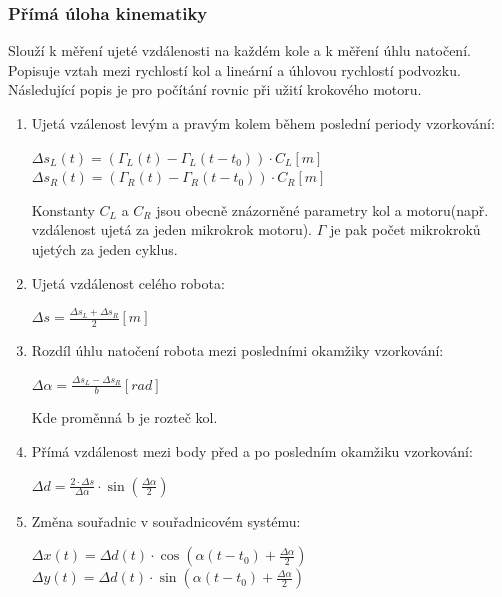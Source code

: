 \subsubsection{Přímá úloha kinematiky}
Slouží k měření ujeté vzdálenosti na každém kole a k měření úhlu natočení.\\
Popisuje vztah mezi rychlostí kol a lineární a úhlovou rychlostí podvozku.\\
Následující popis je pro počítání rovnic při užití krokového motoru.\\
\begin{enumerate}
    \item Ujetá vzálenost levým a pravým kolem během poslední periody vzorkování:
          \begin{center}
              \(\Delta s_L(t) = (\Gamma_L(t)-\Gamma_L(t-t_0))\cdot C_L [m]\)\\
              \(\Delta s_R(t) = (\Gamma_R(t)-\Gamma_R(t-t_0))\cdot C_R [m]\)
          \end{center}
          Konstanty \(C_L\) a \(C_R\) jsou obecně znázorněné parametry kol a motoru(např. vzdálenost ujetá za jeden mikrokrok motoru). \(\Gamma \) je pak počet mikrokroků ujetých za jeden cyklus.
    \item Ujetá vzdálenost celého robota:
          \begin{center}
              \(\Delta s =  \frac{\Delta s_L + \Delta s_R}{2}[m]\)
          \end{center}
    \item Rozdíl úhlu natočení robota mezi posledními okamžiky vzorkování:
          \begin{center}
              \(\Delta \alpha = \frac{\Delta s_L - \Delta s_R}{b}[rad]\)
          \end{center}
          Kde proměnná b je rozteč kol.
    \item Přímá vzdálenost mezi body před a po posledním okamžiku vzorkování:
          \begin{center}
              \(\Delta d = \frac{2\cdot \Delta s}{\Delta \alpha} \cdot \sin(\frac{\Delta \alpha}{2})\)
          \end{center}
    \item Změna souřadnic v souřadnicovém systému:
          \begin{center}
              \(\Delta x(t) = \Delta d(t)\cdot\cos(\alpha(t-t_0)+\frac{\Delta \alpha}{2})\)\\
              \(\Delta y(t) = \Delta d(t)\cdot\sin(\alpha(t-t_0)+\frac{\Delta \alpha}{2})\)\\

\end{center}
\end{enumerate}
